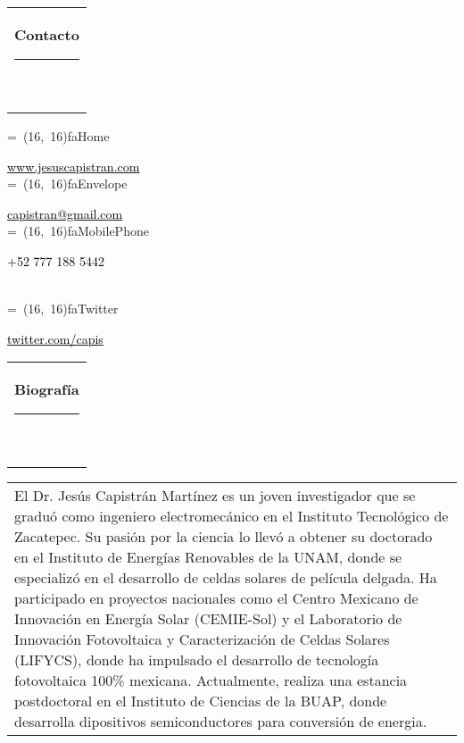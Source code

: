 \documentclass[10pt,letter]{article}
\newcommand*{\vcenteredhbox}[1]{\begingroup
\setbox0=\hbox{#1}\parbox{\wd0}{\box0}\endgroup}
\newcommand{\icon}[3] { 							
	\makebox(#2, #2){\textcolor{maincol}{\csname fa#1\endcsname}}
}
\newcommand{\icontext}[4]{ 						
	\vcenteredhbox{\icon{#1}{#2}{#3}}  \hspace{2pt}  \parbox{0.9\mpwidth}{\textcolor{#4}{#3}}
}
\newcommand{\iconhref}[5]{ 						
    \vcenteredhbox{\icon{#1}{#2}{#5}}  \hspace{2pt} \href{#4}{\textcolor{#5}{#3}}
}
\newcommand{\iconemail}[5]{ 						
    \vcenteredhbox{\icon{#1}{#2}{#5}}  \hspace{2pt} \href{mailto:#4}{\textcolor{#5}{#3}}
}
\newcommand{\mpwidth}{\linewidth-\fboxsep-\fboxsep}
\newcommand{\cvtext}[1] {
	\begin{tabular*}{1\mpwidth}{p{0.98\mpwidth}}
		\parbox{1\mpwidth}{#1}
	\end{tabular*}
}
\newcommand{\cvsection}[1] {
	\vspace{14pt}
	\cvtext{
		\textbf{\LARGE{\textcolor{darkcol}{#1}}}\\[-4pt]
		\textcolor{accentcol}{ \rule{0.2\textwidth}{1.5pt} } \\
	}
}
\newcommand{\cvqrcode}[1] {
	\begin{center}
		\texttt{[image: qrcode]}
	\end{center}
}
\begin{document}
\begin{paracol}{2}
\begin{leftcolumn}
\cvsection{Contacto}

\iconhref{Home}{16}{www.jesuscapistran.com}{https://jesuscapistran.com}{black}\\[6pt]
\iconemail{Envelope}{16}{capistran@gmail.com}{capistran@gmail.com}{black}\\[6pt]
\icontext{MobilePhone}{16}{ +52 777 188 5442}{black}\\[6pt]
\iconhref{Twitter}{16}{twitter.com/capis}{https://www.twitter.com/capis}{black}\\[6pt]


	

\end{leftcolumn}
\begin{rightcolumn}




\cvsection{Biograf\'ia}
\vspace{4pt}

\cvtext{ 
	El Dr. Jesús Capistrán Martínez es un joven investigador que se graduó como ingeniero electromecánico en el Instituto Tecnológico de Zacatepec. Su pasión por la ciencia lo llevó a obtener su doctorado en el Instituto de Energías Renovables de la UNAM, donde se especializó en el desarrollo de celdas solares de película delgada.
	Ha participado en proyectos nacionales como el Centro Mexicano de Innovación en Energía Solar (CEMIE-Sol) y el Laboratorio de Innovación Fotovoltaica y Caracterización de Celdas Solares (LIFYCS), donde ha impulsado el desarrollo de tecnología fotovoltaica 100\% mexicana.
	Actualmente, realiza una estancia postdoctoral en el Instituto de Ciencias de la BUAP, donde desarrolla dipositivos semiconductores para conversión de energia. 

}
\end{rightcolumn}
\end{paracol}
\end{document}
